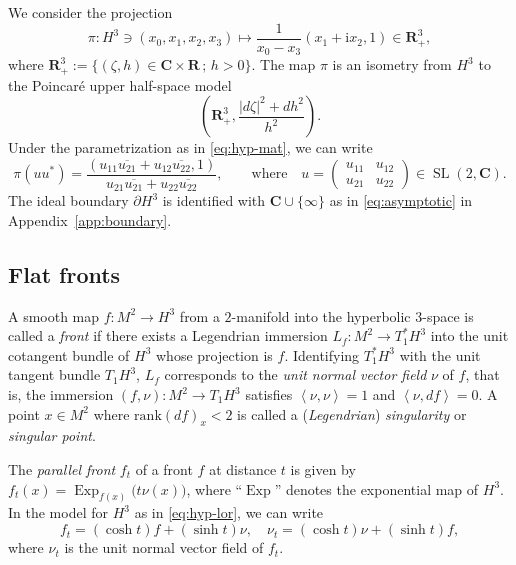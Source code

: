 \documentclass[a4paper]{amsart}
\theoremstyle{plain}
\theoremstyle{remark}
\numberwithin{equation}{section}
\begin{document}
We consider the projection 
\begin{equation}\label{eq:proj0}
   \pi:H^3 \ni (x_0,x_1,x_2,x_3)\longmapsto \frac{1}{x_0-x_3}
   (x_1+ {\mathrm{i}} x_2,1)\in {\boldsymbol{R}}^3_+ , 
\end{equation}
where ${\boldsymbol{R}}^3_+:=\{ (\zeta,h)\in {\boldsymbol{C}}\times {\boldsymbol{R}}\,;\, h>0\}$.
The map $\pi$ is an isometry from $H^3$ to the Poincar\'e upper 
half-space model
\begin{equation}\label{eq:upper-metric}
 \left({\boldsymbol{R}}^3_+,\frac{|d\zeta|^2+dh^2}{h^2}\right).
\end{equation}
Under the parametrization as in \eqref{eq:hyp-mat}, 
we can write
\begin{equation}\label{eq:proj-mat}
   \pi(uu^*) = 
      \frac{
      \left(
          u_{11} \overline{u_{21}}  + 
          u_{12} \overline{u_{22}} , 1
      \right)}{
      u_{21}\overline{u_{21}}+u_{22}\overline{u_{22}}},
      \qquad
      \text{where}\quad
      u=\begin{pmatrix}
	  u_{11} & u_{12} \\
	  u_{21} & u_{22}
	 \end{pmatrix}\in{\operatorname{SL}}(2,{\boldsymbol{C}}).
\end{equation}
The ideal boundary $\partial H^3$ is identified with ${\boldsymbol{C}}\cup\{\infty\}$
as in \eqref{eq:asymptotic} in Appendix~\ref{app:boundary}.

\subsection*{Flat fronts}
A smooth map $f\colon{}M^2\to H^3$ from a $2$-manifold into the 
hyperbolic $3$-space is called a {\em front\/} if 
there exists a Legendrian immersion $L_f\colon{}M^2\to T_1^*H^3$
into the unit cotangent bundle of $H^3$ whose projection is $f$.
Identifying $T_1^*H^3$ with the unit tangent bundle $T_1H^3$, 
$L_f$ corresponds to the {\em unit normal vector field\/}
$\nu$ of $f$, that is, 
the immersion $(f,\nu)\colon{}M^2\to T_1H^3$ satisfies
${\left\langle{{\nu}},{{\nu}}\right\rangle} = 1$ and ${\left\langle{{\nu}},{{df}}\right\rangle} = 0$.  
A point $x \in M^2$ where $\text{rank} (df)_x < 2$ 
is called a ({\it Legendrian}) {\it singularity\/} or 
{\it singular point\/}. 

The {\em parallel front\/} $f_t$ of a front $f$ at distance 
$t$ is given by $f_t(x)={\operatorname{Exp}}_{f(x)}\bigl(t\nu(x)\bigr)$, 
where ``${\operatorname{Exp}}$'' denotes the exponential map of $H^3$. 
In the model for $H^3$ as in \eqref{eq:hyp-lor}, we can write
\begin{equation}\label{eq:parallel}
   f_t = (\cosh t) f + (\sinh t) \nu, \quad
   \nu_t =(\cosh t) \nu + (\sinh t) f,
\end{equation}
where $\nu_t$ is the unit normal vector field of $f_t$.
\end{document}
